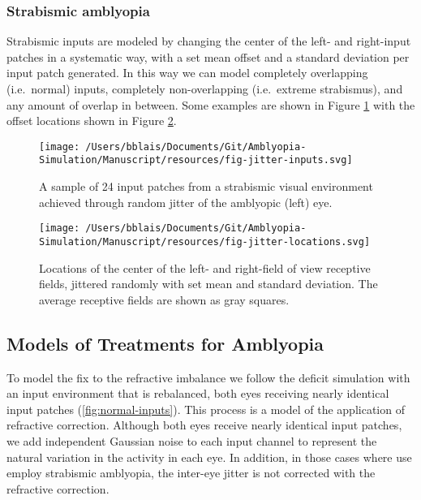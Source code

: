 \documentclass[
  onecolumn]{article}
\begin{document}
\hypertarget{strabismic-amblyopia}{%
\subsubsection{Strabismic amblyopia}\label{strabismic-amblyopia}}

Strabismic inputs are modeled by changing the center of the left- and
right-input patches in a systematic way, with a set mean offset and a
standard deviation per input patch generated. In this way we can model
completely overlapping (i.e.~normal) inputs, completely non-overlapping
(i.e.~extreme strabismus), and any amount of overlap in between. Some
examples are shown in Figure \ref{fig:jitter-inputs} with the offset
locations shown in Figure \ref{fig:jitter-input-locations}.

\begin{figure}
\hypertarget{fig:jitter-inputs}{%
\centering
\texttt{[image: /Users/bblais/Documents/Git/Amblyopia-Simulation/Manuscript/resources/fig-jitter-inputs.svg]}
\caption{A sample of 24 input patches from a strabismic visual
environment achieved through random jitter of the amblyopic (left)
eye.}\label{fig:jitter-inputs}
}
\end{figure}

\begin{figure}
\hypertarget{fig:jitter-input-locations}{%
\centering
\texttt{[image: /Users/bblais/Documents/Git/Amblyopia-Simulation/Manuscript/resources/fig-jitter-locations.svg]}
\caption{Locations of the center of the left- and right-field of view
receptive fields, jittered randomly with set mean and standard
deviation. The average receptive fields are shown as gray
squares.}\label{fig:jitter-input-locations}
}
\end{figure}

\hypertarget{models-of-treatments-for-amblyopia}{%
\subsection{Models of Treatments for
Amblyopia}\label{models-of-treatments-for-amblyopia}}

To model the fix to the refractive imbalance we follow the deficit
simulation with an input environment that is rebalanced, both eyes
receiving nearly identical input patches (\ref{fig:normal-inputs}). This
process is a model of the application of refractive correction. Although
both eyes receive nearly identical input patches, we add independent
Gaussian noise to each input channel to represent the natural variation
in the activity in each eye. In addition, in those cases where use
employ strabismic amblyopia, the inter-eye jitter is not corrected with
the refractive correction.
\end{document}

